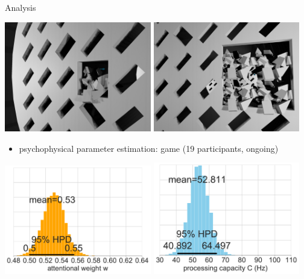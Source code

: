 \documentclass[a0paper,portrait]{baposter}
\begin{document}
\begin{poster}
\begin{posterbox}[name=results,span=1,column=2,row=0]{Analysis}
\begin{center}
\includegraphics[width=0.48\textwidth]{unclear.jpg}
\includegraphics[width=0.48\textwidth]{unclear2.jpg}
\end{center}

\begin{itemize}
\item psychophysical parameter estimation: game (19 participants, ongoing)
\end{itemize}

\begin{center}
\includegraphics[width=0.48\textwidth]{game-w-hdi.pdf}
\includegraphics[width=0.48\textwidth]{game-c-hdi.pdf}
\end{center}


\end{posterbox}
\end{poster}
\end{document}
